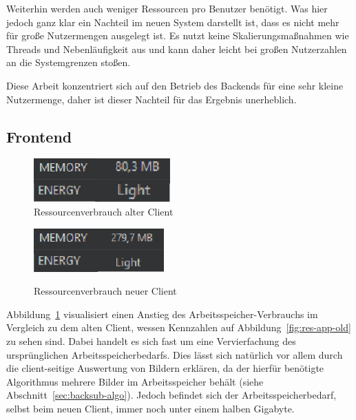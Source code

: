 Weiterhin werden auch weniger Ressourcen pro Benutzer benötigt.
Was hier jedoch ganz klar ein Nachteil im neuen System darstellt ist, dass es nicht mehr für große Nutzermengen ausgelegt ist.
Es nutzt keine Skalierungsmaßnahmen wie Threads und Nebenläufigkeit aus und kann daher leicht bei großen Nutzerzahlen an die Systemgrenzen stoßen.

Diese Arbeit konzentriert sich auf den Betrieb des Backends für eine sehr kleine Nutzermenge, daher ist dieser Nachteil für das Ergebnis unerheblich.

\subsection{Frontend}
\begin{figure}[ht]
  \centering
	\begin{minipage}[b]{0.4\textwidth}
     \includegraphics[width=\textwidth]{Bilder/res-app-old} \\
   \caption{Ressourcenverbrauch alter Client}
   \label{fig:res-app-old}
  \end{minipage}
	\hfill
	\begin{minipage}[b]{0.4\textwidth}
     \includegraphics[width=\textwidth]{Bilder/res-app-new} \\
		\caption{Ressourcenverbrauch neuer Client}
		\label{fig:res-app-new}
	\end{minipage}
\end{figure}

Abbildung~\ref{fig:res-app-new} visualisiert einen Anstieg des Arbeitsspeicher-Verbrauchs im Vergleich zu dem alten Client, wessen Kennzahlen auf Abbildung~\ref{fig:res-app-old} zu sehen sind.
Dabei handelt es sich fast um eine Vervierfachung des ursprünglichen Arbeitsspeicherbedarfs.
Dies lässt sich natürlich vor allem durch die client-seitige Auswertung von Bildern erklären, da der hierfür benötigte Algorithmus mehrere Bilder im Arbeitsspeicher behält (siehe Abschnitt~\ref{sec:backsub-algo}).
Jedoch befindet sich der Arbeitsspeicherbedarf, selbst beim neuen Client, immer noch unter einem halben Gigabyte.

